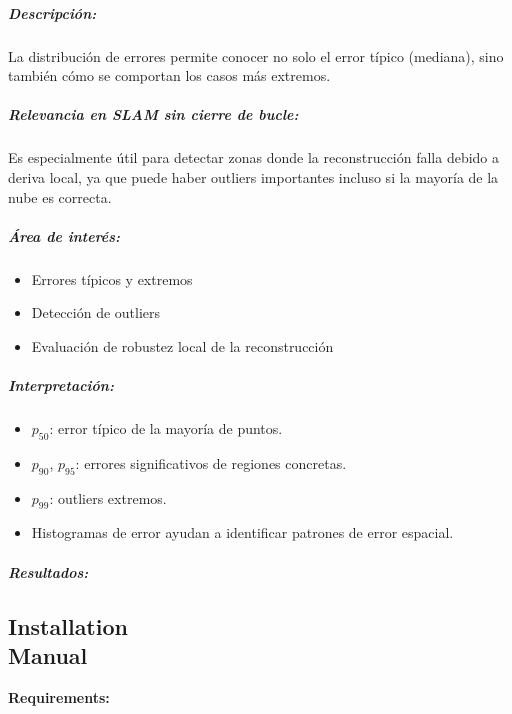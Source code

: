\documentclass[12pt, a4paper, twoside]{article}
\begin{document}
\subparagraph{Descripción:}
La distribución de errores permite conocer no solo el error típico (mediana), sino también cómo se comportan los casos más extremos.

\subparagraph{Relevancia en SLAM sin cierre de bucle:}
Es especialmente útil para detectar zonas donde la reconstrucción falla debido a deriva local, ya que puede haber outliers 
importantes incluso si la mayoría de la nube es correcta.

\subparagraph{Área de interés:}
\begin{itemize}
  \item Errores típicos y extremos
  \item Detección de outliers
  \item Evaluación de robustez local de la reconstrucción
\end{itemize}

\subparagraph{Interpretación:}
\begin{itemize}
  \item $p_{50}$: error típico de la mayoría de puntos.  
  \item $p_{90}$, $p_{95}$: errores significativos de regiones concretas.  
  \item $p_{99}$: outliers extremos.  
  \item Histogramas de error ayudan a identificar patrones de error espacial.
\end{itemize}

\subparagraph{Resultados:}





\newpage

\begin{umaappendices}

\section{Installation \\ Manual}
  
  \textbf{\large{Requirements:}}

\end{umaappendices}
\end{document}
